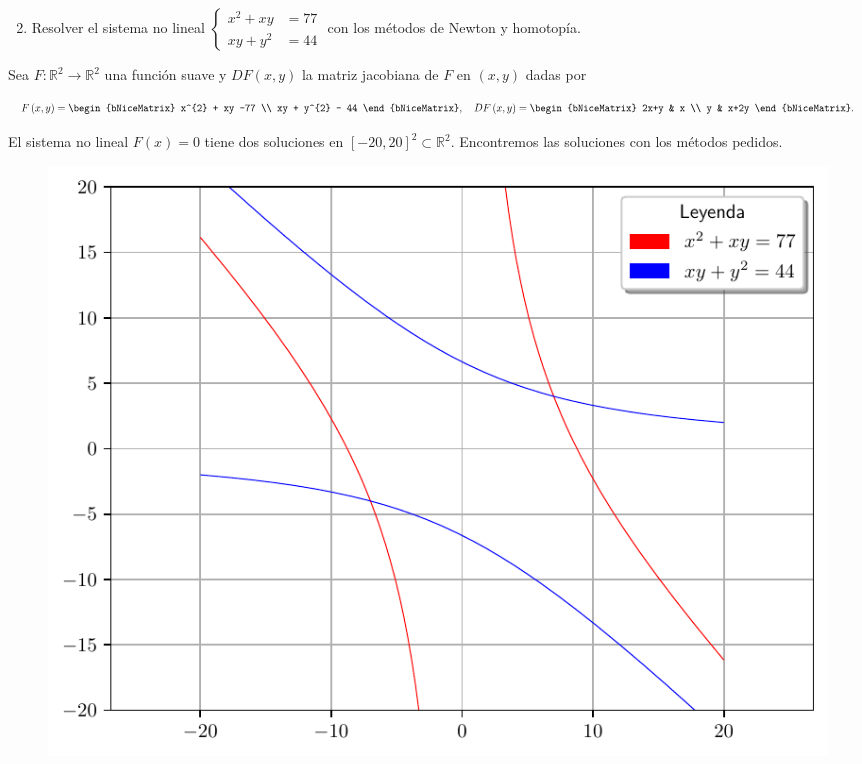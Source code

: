 \begin{frame}
	\begin{enumerate}\setcounter{enumi}{1}
		\item

		      Resolver el sistema no lineal
		      \begin{math}
			      \left\{
			      \begin{aligned}
				      x^{2} + xy  & = 77 \\
				      xy  + y^{2} & = 44
			      \end{aligned}
			      \right.
		      \end{math}
		      con los métodos de Newton y
		      homotopía.
	\end{enumerate}

	\begin{solution}
		Sea $F\colon\mathbb{R}^{2}\to\mathbb{R}^{2}$ una función suave y
		$DF\left(x,y\right)$ la matriz jacobiana de $F$ en $\left(x,y\right)$ dadas por

		\begin{equation*}
			F\left(x,y\right)=
			\begin{bNiceMatrix}
				x^{2} + xy -77 \\
				xy  + y^{2} - 44
			\end{bNiceMatrix},\quad
			DF\left(x,y\right)=
			\begin{bNiceMatrix}
				2x+y & x    \\
				y    & x+2y
			\end{bNiceMatrix}.
		\end{equation*}

		El sistema no lineal $F\left(x\right)=0$ tiene dos soluciones en
		${\left[-20,20\right]}^{2}\subset\mathbb{R}^{2}$.
		Encontremos las soluciones con los métodos pedidos.

		\begin{figure}[ht!]
			\centering
			\includegraphics[width=0.45\paperwidth]{p2_plot}
		\end{figure}
	\end{solution}
\end{frame}

